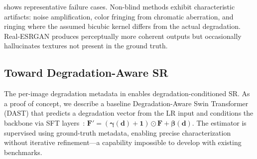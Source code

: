  shows representative failure cases.
Non-blind methods exhibit characteristic artifacts: noise amplification, color fringing from chromatic aberration, and ringing where the assumed bicubic kernel differs from the actual degradation.
Real-ESRGAN produces perceptually more coherent outputs but occasionally hallucinates textures not present in the ground truth.

\subsection{Toward Degradation-Aware SR}
\label{sec:exp_dast}

The per-image degradation metadata in \dataset enables degradation-conditioned SR.
As a proof of concept, we describe a baseline Degradation-Aware Swin Transformer (DAST) that predicts a degradation vector from the LR input and conditions the backbone via SFT layers~\cite{wang2018recovering}: $\mathbf{F}' = (\bm{\gamma}(\mathbf{d}) + \mathbf{1}) \odot \mathbf{F} + \bm{\beta}(\mathbf{d})$.
The estimator is supervised using ground-truth metadata, enabling precise characterization without iterative refinement---a capability impossible to develop with existing benchmarks.
